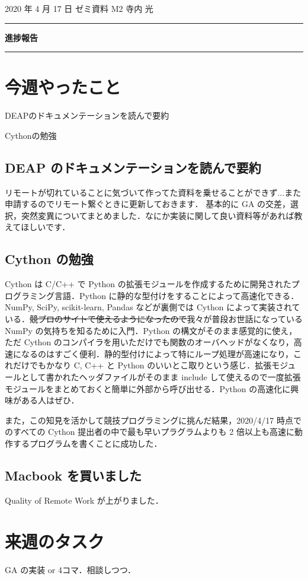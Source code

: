 \documentclass[onecolumn]{ujarticle}   %
\begin{document}
	\noindent

	\hspace{1em}
	2020 年 4 月 17 日
	ゼミ資料
	\hfill
	M2 寺内 光

	\vspace{2mm}

	\hrule

	\begin{center}
		{\Large \bf 進捗報告}
	\end{center}


	\hrule
	\vspace{3mm}

	\section{今週やったこと}
	\begin{itemize}{
		\item{DEAPのドキュメンテーションを読んで要約}
		\item{Cythonの勉強}
	}\end{itemize}
	\subsection{DEAP のドキュメンテーションを読んで要約}
	リモートが切れていることに気づいて作ってた資料を乗せることができず...また申請するのでリモート繋ぐときに更新しておきます．
	基本的に GA の交差，選択，突然変異についてまとめました．なにか実装に関して良い資料等があれば教えてほしいです．

	\subsection{Cython の勉強}
	Cython は C/C++ で Python の拡張モジュールを作成するために開発されたプログラミング言語．Python に静的な型付けをすることによって高速化できる．NumPy, SciPy, scikit-learn, Pandas などが裏側では Cython によって実装されている．\sout{競プロのサイトで使えるようになったので}我々が普段お世話になっている NumPy の気持ちを知るために入門．Python の構文がそのまま感覚的に使え，ただ Cython のコンパイラを用いただけでも関数のオーバヘッドがなくなり，高速になるのはすごく便利．静的型付けによって特にループ処理が高速になり，これだけでもかなり C, C++ と Python のいいとこ取りという感じ．拡張モジュールとして書かれたヘッダファイルがそのまま include して使えるので一度拡張モジュールをまとめておくと簡単に外部から呼び出せる．Python の高速化に興味がある人はぜひ．

	また，この知見を活かして競技プログラミングに挑んだ結果，2020/4/17 時点でのすべての Cython 提出者の中で最も早いプラグラムよりも 2 倍以上も高速に動作するプログラムを書くことに成功した．
	\cite{atcoder}

	\subsection{Macbook を買いました}
	Quality of Remote Work が上がりました．

	\section{来週のタスク}
	GA の実装 or 4コマ．相談しつつ．

	
	
\end{document}

